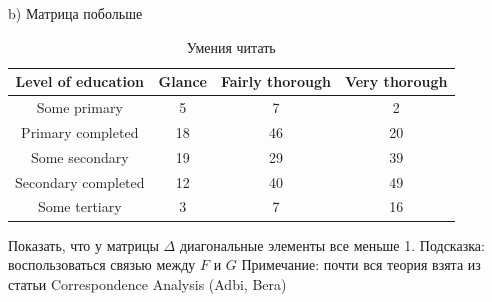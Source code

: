 b) Матрица побольше \begin{table}[H]
    \centering
    \begin{tabular}{cccc}
        \toprule
        Level of education  & Glance & Fairly thorough & Very thorough \\
        \midrule
        Some primary        & 5      & 7               & 2             \\
        Primary completed   & 18     & 46              & 20            \\
        Some secondary      & 19     & 29              & 39            \\
        Secondary completed & 12     & 40              & 49            \\
        Some tertiary       & 3      & 7               & 16            \\
        \bottomrule
    \end{tabular}
    \caption{Умения читать}
\end{table}
\problem Показать, что у матрицы $\Delta$ диагональные элементы все меньше 1.
Подсказка: воспользоваться связью между $F$ и $G$
Примечание: почти вся теория взята из статьи Correspondence Analysis (Adbi, Bera)

